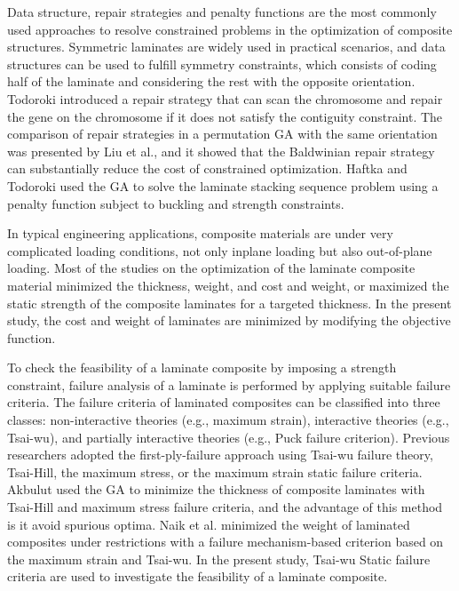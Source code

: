 \documentclass[USenglish,twocolumn]{article}
\begin{document}
Data structure, repair strategies and penalty functions\cite{le1995improved} are the most commonly used
approaches to resolve constrained problems in the optimization of composite structures. Symmetric
laminates are widely used in practical scenarios, and data structures can be used to fulfill symmetry
constraints, which consists of coding half of the laminate and considering the rest with the
opposite orientation. Todoroki\cite{todoroki1998stacking} introduced a repair strategy that can scan the chromosome and
repair the gene on the chromosome if it does not satisfy the contiguity constraint. The comparison of
repair strategies in a permutation GA with the same orientation was presented by Liu et al.\cite{liu2000permutation}, and it
showed that the Baldwinian repair strategy can substantially reduce the cost of constrained optimization.
Haftka and Todoroki\cite{riche1993optimization} used the GA to solve the laminate stacking sequence problem using a penalty function subject to
buckling and strength constraints.

In typical engineering applications, composite materials are under very complicated loading
conditions, not only inplane loading but also out-of-plane loading. Most of the studies on the
optimization of the laminate composite material minimized the
thickness\cite{abu1998optimum,walker2003technique},
weight\cite{fang1993design,deka2005multiobjective,park2008improved}, and cost and
weight\cite{deka2005multiobjective,omkar2008artificial}, or maximized the static strength of
the composite laminates for a targeted
thickness\cite{walker2003technique,lin2004stacking,kim2007development,gholami2020multi}. 
In the present study,
the cost and weight of laminates are minimized by modifying the objective function.

To check the feasibility of a laminate composite by imposing a strength constraint, failure
analysis of a laminate is performed by applying suitable failure criteria. The failure criteria of
laminated composites can be classified into three classes: non-interactive theories (e.g., maximum
strain), interactive theories (e.g., Tsai-wu), and partially interactive theories (e.g., Puck failure
criterion). Previous researchers adopted the first-ply-failure approach using Tsai-wu
failure
theory\cite{massard1984computer,reddy1987first,fang1993design,soeiro1994multilevel,pelletier2006multi,jadhav2007parametric,omkar2008artificial,choudhury2019failure},
Tsai-Hill\cite{martin1987optimum,soares1995discrete}, the maximum stress\cite{watkins1987multicriteria}, or the maximum strain\cite{watkins1987multicriteria}
static failure criteria. Akbulut\cite{akbulut2008optimum} used the GA to minimize the thickness of composite laminates with
Tsai-Hill and maximum stress failure criteria, and the advantage of this method is it avoid spurious
optima. Naik et al.\cite{naik2008design}
minimized the weight of laminated composites under restrictions with a
failure mechanism-based criterion based on the maximum strain and Tsai-wu. In the present study, Tsai-wu
Static failure criteria are used to investigate the feasibility of a laminate composite.
\end{document}
